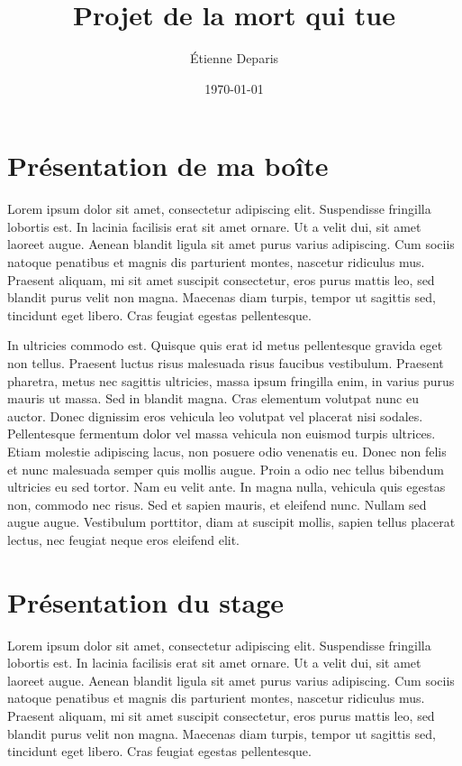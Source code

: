 \documentclass[a4paper,12pt]{report}
\title{Projet de la mort qui tue}
\author{Étienne Deparis}
\date{\today}
\begin{document}
\renewcommand{\labelitemi}{\large\textcolor{tatoebagreen}{\fg}}
\groovypdtitre
\restoregeometry

\tableofcontents

\chapter{Présentation de ma boîte}
Lorem ipsum dolor sit amet, consectetur adipiscing elit. Suspendisse
fringilla lobortis est. In lacinia facilisis erat sit amet ornare. Ut
a velit dui, sit amet laoreet augue. Aenean blandit ligula sit amet
purus varius adipiscing. Cum sociis natoque penatibus et magnis dis
parturient montes, nascetur ridiculus mus. Praesent aliquam, mi sit
amet suscipit consectetur, eros purus mattis leo, sed blandit purus
velit non magna. Maecenas diam turpis, tempor ut sagittis sed,
tincidunt eget libero. Cras feugiat egestas pellentesque.

In ultricies commodo est. Quisque quis erat id metus pellentesque
gravida eget non tellus. Praesent luctus risus malesuada risus
faucibus vestibulum. Praesent pharetra, metus nec sagittis ultricies,
massa ipsum fringilla enim, in varius purus mauris ut massa. Sed in
blandit magna. Cras elementum volutpat nunc eu auctor. Donec dignissim
eros vehicula leo volutpat vel placerat nisi sodales. Pellentesque
fermentum dolor vel massa vehicula non euismod turpis ultrices. Etiam
molestie adipiscing lacus, non posuere odio venenatis eu. Donec non
felis et nunc malesuada semper quis mollis augue. Proin a odio nec
tellus bibendum ultricies eu sed tortor. Nam eu velit ante. In magna
nulla, vehicula quis egestas non, commodo nec risus. Sed et sapien
mauris, et eleifend nunc. Nullam sed augue augue. Vestibulum
porttitor, diam at suscipit mollis, sapien tellus placerat lectus, nec
feugiat neque eros eleifend elit.

\chapter{Présentation du stage}
Lorem ipsum dolor sit amet, consectetur adipiscing elit. Suspendisse
fringilla lobortis est. In lacinia facilisis erat sit amet ornare. Ut
a velit dui, sit amet laoreet augue. Aenean blandit ligula sit amet
purus varius adipiscing. Cum sociis natoque penatibus et magnis dis
parturient montes, nascetur ridiculus mus. Praesent aliquam, mi sit
amet suscipit consectetur, eros purus mattis leo, sed blandit purus
velit non magna. Maecenas diam turpis, tempor ut sagittis sed,
tincidunt eget libero. Cras feugiat egestas pellentesque.
\end{document}
